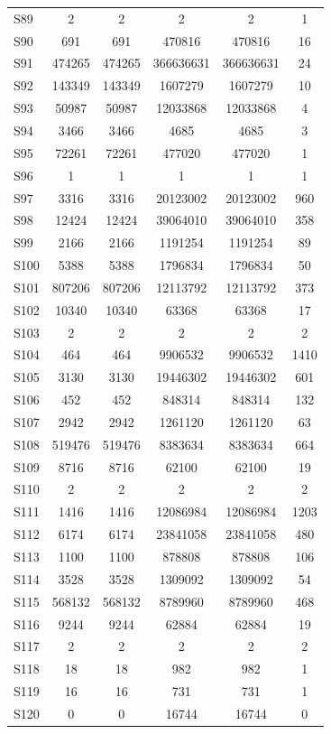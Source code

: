 {\begin{longtable}{l S[table-format=9.0] S[table-format=9.0] S[table-format=9.0] S[table-format=9.0] S[table-format=9.0]}
S89 & 2 & 2 & 2 & 2 & 1 \\
S90 & 691 & 691 & 470816 & 470816 & 16 \\
S91 & 474265 & 474265 & 366636631 & 366636631 & 24 \\
S92 & 143349 & 143349 & 1607279 & 1607279 & 10 \\
S93 & 50987 & 50987 & 12033868 & 12033868 & 4 \\
S94 & 3466 & 3466 & 4685 & 4685 & 3 \\
S95 & 72261 & 72261 & 477020 & 477020 & 1 \\
S96 & 1 & 1 & 1 & 1 & 1 \\
S97 & 3316 & 3316 & 20123002 & 20123002 & 960 \\
S98 & 12424 & 12424 & 39064010 & 39064010 & 358 \\
S99 & 2166 & 2166 & 1191254 & 1191254 & 89 \\
S100 & 5388 & 5388 & 1796834 & 1796834 & 50 \\
S101 & 807206 & 807206 & 12113792 & 12113792 & 373 \\
S102 & 10340 & 10340 & 63368 & 63368 & 17 \\
S103 & 2 & 2 & 2 & 2 & 2 \\
S104 & 464 & 464 & 9906532 & 9906532 & 1410 \\
S105 & 3130 & 3130 & 19446302 & 19446302 & 601 \\
S106 & 452 & 452 & 848314 & 848314 & 132 \\
S107 & 2942 & 2942 & 1261120 & 1261120 & 63 \\
S108 & 519476 & 519476 & 8383634 & 8383634 & 664 \\
S109 & 8716 & 8716 & 62100 & 62100 & 19 \\
S110 & 2 & 2 & 2 & 2 & 2 \\
S111 & 1416 & 1416 & 12086984 & 12086984 & 1203 \\
S112 & 6174 & 6174 & 23841058 & 23841058 & 480 \\
S113 & 1100 & 1100 & 878808 & 878808 & 106 \\
S114 & 3528 & 3528 & 1309092 & 1309092 & 54 \\
S115 & 568132 & 568132 & 8789960 & 8789960 & 468 \\
S116 & 9244 & 9244 & 62884 & 62884 & 19 \\
S117 & 2 & 2 & 2 & 2 & 2 \\
S118 & 18 & 18 & 982 & 982 & 1 \\
S119 & 16 & 16 & 731 & 731 & 1 \\
S120 & 0 & 0 & 16744 & 16744 & 0 \\

\end{longtable}}

